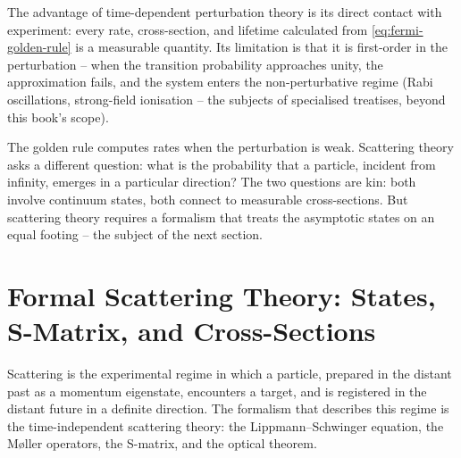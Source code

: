 The advantage of time-dependent perturbation theory is its direct contact with experiment: every rate, cross-section, and lifetime calculated from \eqref{eq:fermi-golden-rule} is a measurable quantity. Its limitation is that it is first-order in the perturbation -- when the transition probability approaches unity, the approximation fails, and the system enters the non-perturbative regime (Rabi oscillations, strong-field ionisation -- the subjects of specialised treatises, beyond this book's scope).

The golden rule computes rates when the perturbation is weak. Scattering theory asks a different question: what is the probability that a particle, incident from infinity, emerges in a particular direction? The two questions are kin: both involve continuum states, both connect to measurable cross-sections. But scattering theory requires a formalism that treats the asymptotic states on an equal footing -- the subject of the next section.

\section{Formal Scattering Theory: States, S-Matrix, and Cross-Sections}
\label{sec:scattering-formalism}

Scattering is the experimental regime in which a particle, prepared in the distant past as a momentum eigenstate, encounters a target, and is registered in the distant future in a definite direction. The formalism that describes this regime is the time-independent scattering theory: the Lippmann--Schwinger equation, the M\o{}ller operators, the S-matrix, and the optical theorem.

